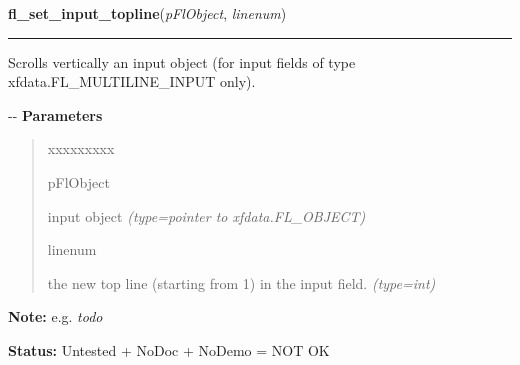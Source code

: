 \hspace{.8\funcindent}\begin{boxedminipage}{\funcwidth}

    \raggedright \textbf{fl\_set\_input\_topline}(\textit{pFlObject}, \textit{linenum})

    \vspace{-1.5ex}

    \rule{\textwidth}{0.5\fboxrule}
\setlength{\parskip}{2ex}

Scrolls vertically an input object (for input fields of type
xfdata.FL\_MULTILINE\_INPUT only).

-{}-
\setlength{\parskip}{1ex}
      \textbf{Parameters}
      \vspace{-1ex}

      \begin{quote}
        \begin{Ventry}{xxxxxxxxx}

          \item[pFlObject]


input object
            {\it (type=pointer to xfdata.FL\_OBJECT)}

          \item[linenum]


the new top line (starting from 1) in the input field.
            {\it (type=int)}

        \end{Ventry}

      \end{quote}

\textbf{Note:} 
e.g. \emph{todo}


\textbf{Status:} 
Untested + NoDoc + NoDemo = NOT OK


    \end{boxedminipage}

    \label{xformslib:flinput:fl_set_input_scrollbarsize}

    \vspace{0.5ex}

